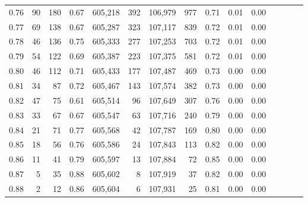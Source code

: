 \begin{tabular}{rrrcrrrrrrrrrrr}
0.76 &      90 &    180 &                                       0.67 &  605,218 &      392 &  106,979 &      977 &  0.71 &  0.01 &                         0.00 \\
0.77 &      69 &    138 &                                       0.67 &  605,287 &      323 &  107,117 &      839 &  0.72 &  0.01 &                         0.00 \\
0.78 &      46 &    136 &                                       0.75 &  605,333 &      277 &  107,253 &      703 &  0.72 &  0.01 &                         0.00 \\
0.79 &      54 &    122 &                                       0.69 &  605,387 &      223 &  107,375 &      581 &  0.72 &  0.01 &                         0.00 \\
0.80 &      46 &    112 &                                       0.71 &  605,433 &      177 &  107,487 &      469 &  0.73 &  0.00 &                         0.00 \\
0.81 &      34 &     87 &                                       0.72 &  605,467 &      143 &  107,574 &      382 &  0.73 &  0.00 &                         0.00 \\
0.82 &      47 &     75 &                                       0.61 &  605,514 &       96 &  107,649 &      307 &  0.76 &  0.00 &                         0.00 \\
0.83 &      33 &     67 &                                       0.67 &  605,547 &       63 &  107,716 &      240 &  0.79 &  0.00 &                         0.00 \\
0.84 &      21 &     71 &                                       0.77 &  605,568 &       42 &  107,787 &      169 &  0.80 &  0.00 &                         0.00 \\
0.85 &      18 &     56 &                                       0.76 &  605,586 &       24 &  107,843 &      113 &  0.82 &  0.00 &                         0.00 \\
0.86 &      11 &     41 &                                       0.79 &  605,597 &       13 &  107,884 &       72 &  0.85 &  0.00 &                         0.00 \\
0.87 &       5 &     35 &                                       0.88 &  605,602 &        8 &  107,919 &       37 &  0.82 &  0.00 &                         0.00 \\
0.88 &       2 &     12 &                                       0.86 &  605,604 &        6 &  107,931 &       25 &  0.81 &  0.00 &                         0.00 \\

\end{tabular}
